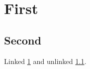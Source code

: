 \documentclass{article}
\begin{document}
\section{First}\label{sec:a}
\subsection{Second}\label{sec:b}
Linked \ref{sec:a} and unlinked \ref*{sec:b}.
\end{document}
